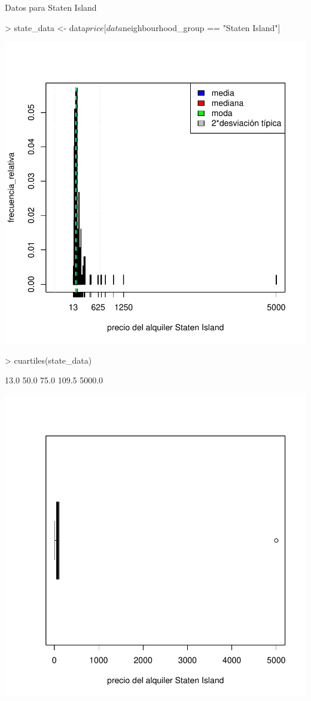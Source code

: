 \documentclass [a4paper] {article}
\begin{document}
Datos para Staten Island
\begin{Schunk}
\begin{Sinput}
> state_data <- data$price[data$neighbourhood_group == "Staten Island"]
\end{Sinput}
\end{Schunk}
\begin{center}
\includegraphics{entrega-state_data_plot}
\begin{Schunk}
\begin{Sinput}
> cuartiles(state_data)
\end{Sinput}
\begin{Soutput}
[1]   13.0   50.0   75.0  109.5 5000.0
\end{Soutput}
\end{Schunk}
\includegraphics{entrega-state_data_plot_c}
\end{center}
\end{document}
